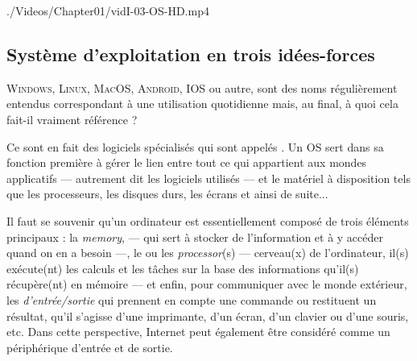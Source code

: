\begin{marginvideo}
		{./Videos/Chapter01/vidI-03-OS-HD.mp4}%
\end{marginvideo}

\subsection[OS : trois idées-forces]{Système d'exploitation en trois idées-forces}
\label{subsub:I.2.1}

\textsc{Windows}, \textsc{Linux}, \textsc{MacOS}, \textsc{Android}, \textsc{IOS} ou autre, sont des noms régulièrement entendus correspondant à une utilisation quotidienne mais, au final, à quoi cela fait-il vraiment référence ? 

Ce sont en fait des logiciels spécialisés qui sont appelés . Un \gls{OS} sert dans sa fonction première à gérer le lien entre tout ce qui appartient aux mondes applicatifs --- autrement dit les logiciels utilisés --- et le matériel à disposition tels que les processeurs, les disques durs, les écrans et ainsi de suite...

Il faut se souvenir qu'un ordinateur est essentiellement composé de trois éléments principaux : la \emph{\gls{memory}}, --- qui sert à stocker de l'information et à y accéder quand on en a besoin ---, le ou les \emph{\gls{processor}}(s) --- cerveau(x) de l'ordinateur, il(s) exécute(nt) les calculs et les tâches sur la base des informations qu'il(s) récupère(nt) en mémoire --- et enfin, pour communiquer avec le monde extérieur, les \emph{ d'entrée/sortie} qui prennent en compte une commande ou restituent un résultat, qu'il s'agisse d'une imprimante, d'un écran, d'un clavier ou d'une souris, etc. Dans cette perspective, Internet peut également être considéré comme un périphérique d'entrée et de sortie.

